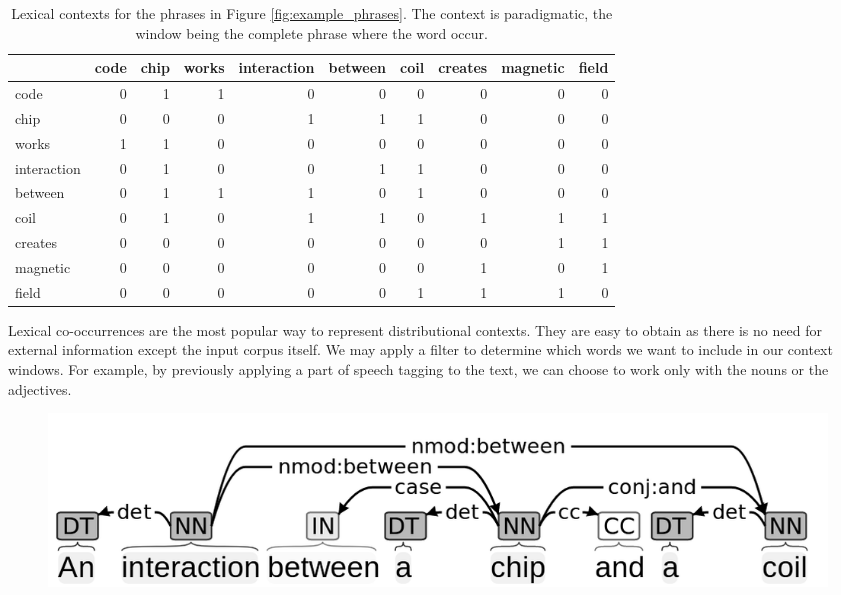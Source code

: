 \begin{table}[]
\centering
\caption{Lexical contexts for the phrases in Figure \ref{fig:example_phrases}. The context is paradigmatic, the window being the complete phrase where the word occur.}
\label{tab:lexical_ex1}
\begin{tabular}{@{}lrrrrrrrrr@{}}
\toprule
       & code & chip & works & interaction & between & coil & creates & magnetic & field \\ \midrule
code        & 0    & 1    & 1     & 0           & 0       & 0    & 0       & 0        & 0     \\
chip        & 0    & 0    & 0     & 1           & 1       & 1    & 0       & 0        & 0     \\
works       & 1    & 1    & 0     & 0           & 0       & 0    & 0       & 0        & 0     \\
interaction & 0    & 1    & 0     & 0           & 1       & 1    & 0       & 0        & 0     \\
between     & 0    & 1    & 1     & 1           & 0       & 1    & 0       & 0        & 0     \\
coil        & 0    & 1    & 0     & 1           & 1       & 0    & 1       & 1        & 1     \\
creates     & 0    & 0    & 0     & 0           & 0       & 0    & 0       & 1        & 1     \\
magnetic    & 0    & 0    & 0     & 0           & 0       & 0    & 1       & 0        & 1     \\
field       & 0    & 0    & 0     & 0           & 0       & 1    & 1       & 1        & 0     \\ \bottomrule
\end{tabular}
\end{table}


Lexical co-occurrences are the most popular way to represent distributional contexts. They are easy to obtain as there is no need for external information except the input corpus itself. We may apply a filter to determine which words we want to include in our context windows. For example, by previously applying a part of speech tagging to the text, we can choose to work only with the nouns or the adjectives. 

 

\begin{figure}
\centering
\includegraphics[width=0.9\linewidth]{images/Chapitre2/exo1_dependences.png}
\caption{}
\label{fig:exo1_dependences}
\end{figure}

